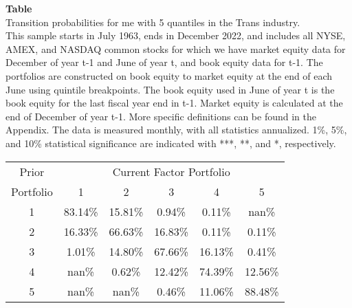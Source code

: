\begin{table*}[ht!]
\raggedright
{}
\label{tab: transition_probs_me_Trans_with_5_quantiles}
\textbf{Table \thetable} \\
Transition probabilities for me with 5 quantiles in the Trans industry. \\
\hspace*{1em}This sample starts in July 1963, ends in December 2022, and includes all NYSE, AMEX, and NASDAQ common stocks for which we have market equity data for December of year t-1 and June of year t, and book equity data for t-1. The portfolios are constructed on book equity to market equity at the end of each June using quintile breakpoints.  The book equity used in June of year t is the book equity for the last fiscal year end in t-1.  Market equity is calculated at the end of December of year t-1.  More specific definitions can be found in the Appendix.  The data is measured monthly, with all statistics annualized.  1\%, 5\%, and 10\% statistical significance are indicated with ***, **, and *, respectively. \\
\vspace{0.5em}
\centering
\begin{adjustbox}{max width=\textwidth}
\begin{tabular}{@{}cccccc@{}}
\toprule
Prior & \multicolumn{5}{c}{Current Factor Portfolio} \\
Portfolio & 1 & 2 & 3 & 4 & 5 \\
\midrule
1 & 83.14\% & 15.81\% & 0.94\% & 0.11\% & nan\% \\
2 & 16.33\% & 66.63\% & 16.83\% & 0.11\% & 0.11\% \\
3 & 1.01\% & 14.80\% & 67.66\% & 16.13\% & 0.41\% \\
4 & nan\% & 0.62\% & 12.42\% & 74.39\% & 12.56\% \\
5 & nan\% & nan\% & 0.46\% & 11.06\% & 88.48\% \\
\bottomrule
\end{tabular}
\end{adjustbox}
\end{table*}